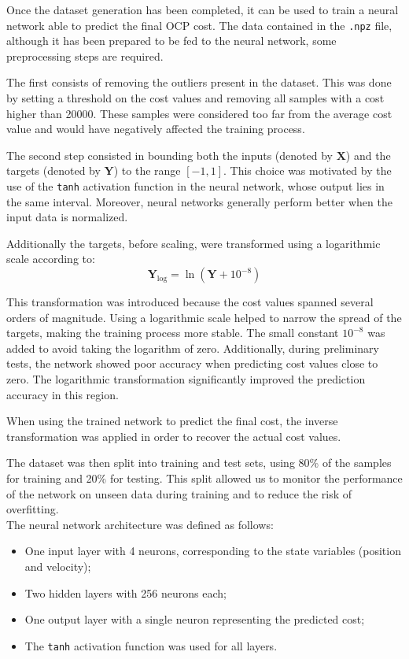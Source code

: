 
\noindent Once the dataset generation has been completed, it can be used to train a neural network able to predict the final OCP cost. The data contained in the \texttt{.npz} file, although it has been prepared to be fed to the neural network, some preprocessing steps are required.

\noindent The first consists of removing the outliers present in the dataset. This was done by setting a threshold on the cost values and removing all samples with a cost higher than 20000. These samples were considered too far from the average cost value and would have negatively affected the training process.

\noindent The second step consisted in bounding both the inputs (denoted by $\mathbf{X}$) and the targets (denoted by $\mathbf{Y}$) to the range $[-1,1]$. This choice was motivated by the use of the \texttt{tanh} activation function in the neural network, whose output lies in the same interval. Moreover, neural networks generally perform better when the input data is normalized.

\noindent Additionally the targets, before scaling, were transformed using a logarithmic scale according to:
\begin{equation}
    \mathbf{Y}_{\text{log}} = \ln(\mathbf{Y} + 10^{-8})
\end{equation}

\noindent This transformation was introduced because the cost values spanned several orders of magnitude. Using a logarithmic scale helped to narrow the spread of the targets, making the training process more stable. The small constant $10^{-8}$ was added to avoid taking the logarithm of zero. Additionally, during preliminary tests, the network showed poor accuracy when predicting cost values close to zero. The logarithmic transformation significantly improved the prediction accuracy in this region.

\noindent When using the trained network to predict the final cost, the inverse transformation was applied in order to recover the actual cost values.

\noindent The dataset was then split into training and test sets, using 80\% of the samples for training and 20\% for testing. This split allowed us to monitor the performance of the network on unseen data during training and to reduce the risk of overfitting.
\\
\noindent The neural network architecture was defined as follows:
\begin{itemize}[noitemsep]
    \item One input layer with 4 neurons, corresponding to the state variables (position and velocity);
    \item Two hidden layers with 256 neurons each;
    \item One output layer with a single neuron representing the predicted cost;
    \item The \texttt{tanh} activation function was used for all layers.
\end{itemize}

